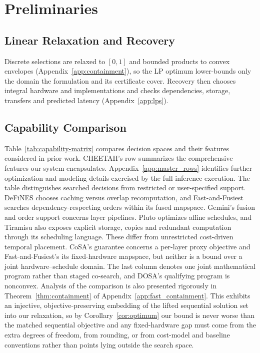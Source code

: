 \section{Preliminaries}\label{sec:prelim}
\subsection{Linear Relaxation and Recovery}
\label{sec:lps}
Discrete selections are relaxed to $[0,1]$ and bounded products to convex envelopes (Appendix~\ref{app:containment}), so the LP optimum lower-bounds only the domain the formulation and its certificate cover.
Recovery then chooses integral hardware and implementations and checks dependencies, storage, transfers and predicted latency (Appendix~\ref{app:lps}).

\subsection{Capability Comparison}
\label{sec:capability-matrix}
Table~\ref{tab:capability-matrix} compares decision spaces and their features considered in prior work.
CHEETAH's row summarizes the comprehensive features our system encapsulates.
Appendix~\ref{app:master_rows} identifies further optimization and modeling details exercised by the full-inference execution.
The table distinguishes searched decisions from restricted or user-specified support.
DeFiNES chooses caching versus overlap recomputation, and Fast-and-Fusiest searches dependency-respecting orders within its fused mapspace.
Gemini's fusion and order support concerns layer pipelines.
Pluto optimizes affine schedules, and Tiramisu also exposes explicit storage, copies and redundant computation through its scheduling language.
These differ from unrestricted cost-driven temporal placement.
CoSA's guarantee concerns a per-layer proxy objective and Fast-and-Fusiest's its fixed-hardware mapspace, but neither is a bound over a joint hardware--schedule domain.
The last column denotes one joint mathematical program rather than staged co-search, and DOSA's qualifying program is nonconvex.
Analysis of the comparison is also presented rigorously in  Theorem~\ref{thm:containment} of Appendix~\ref{app:fast_containment}.
This exhibits an injective, objective-preserving embedding of the lifted sequential solution set into our relaxation, so by Corollary~\ref{cor:optimum} our bound is never worse than the matched sequential objective and any fixed-hardware gap must come from the extra degrees of freedom, from rounding, or from cost-model and baseline conventions rather than points lying outside the search space.
